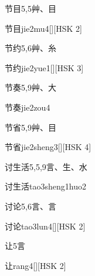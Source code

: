 \begin{entry}{节目}{5,5}{⾋、⽬}
  \begin{phonetics}{节目}{jie2mu4}[][HSK 2]
  \end{phonetics}
\end{entry}

\begin{entry}{节约}{5,6}{⾋、⽷}
  \begin{phonetics}{节约}{jie2yue1}[][HSK 3]
  \end{phonetics}
\end{entry}

\begin{entry}{节奏}{5,9}{⾋、⼤}
  \begin{phonetics}{节奏}{jie2zou4}
  \end{phonetics}
\end{entry}

\begin{entry}{节省}{5,9}{⾋、⽬}
  \begin{phonetics}{节省}{jie2sheng3}[][HSK 4]
  \end{phonetics}
\end{entry}

\begin{entry}{讨生活}{5,5,9}{⾔、⽣、⽔}
  \begin{phonetics}{讨生活}{tao3sheng1huo2}
  \end{phonetics}
\end{entry}

\begin{entry}{讨论}{5,6}{⾔、⾔}
  \begin{phonetics}{讨论}{tao3lun4}[][HSK 2]
  \end{phonetics}
\end{entry}

\begin{entry}{让}{5}{⾔}
  \begin{phonetics}{让}{rang4}[][HSK 2]
  \end{phonetics}
\end{entry}

